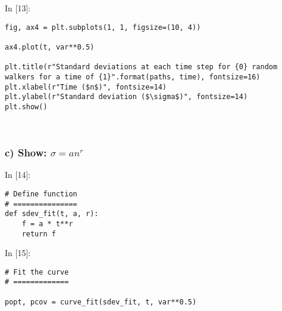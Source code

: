 \documentclass[11pt]{article}
\newif\ifcode
\newif\ifleftmargins
\newlength{\promptlength}
\newcommand{\prompt}[3]{
        \needspace{1.1cm}
        \settowidth{\promptlength}{ #1 [#3] }
        \ifleftmargins\hspace{-\promptlength}\hspace{-5pt}\fi
        {\color{#2}#1 [#3]:}
        \ifleftmargins\vspace{-2.7ex}\fi
    }
\begin{document}
    
\prompt{In}{incolor}{13}
\codetrue
\begin{tcolorbox}[breakable, size=fbox, boxrule=1pt, pad at break*=1mm, colback=cellbackground, colframe=cellborder]
\begin{verbatim}
fig, ax4 = plt.subplots(1, 1, figsize=(10, 4))

ax4.plot(t, var**0.5)

plt.title(r"Standard deviations at each time step for {0} random walkers for a time of {1}".format(paths, time), fontsize=16)    
plt.xlabel(r"Time ($n$)", fontsize=14)
plt.ylabel(r"Standard deviation ($\sigma$)", fontsize=14)
plt.show()
\end{verbatim}
\end{tcolorbox}
\codefalse

    \begin{center}
    \end{center}
    { \hspace*{\fill} \\}
    
    \hypertarget{c-show-sigma-anr}{%
\subsubsection{\texorpdfstring{c) Show:
\(\sigma = an^r\)}{c) Show: \textbackslash{}sigma = an\^{}r}}\label{c-show-sigma-anr}}

    
\prompt{In}{incolor}{14}
\codetrue
\begin{tcolorbox}[breakable, size=fbox, boxrule=1pt, pad at break*=1mm, colback=cellbackground, colframe=cellborder]
\begin{verbatim}
# Define function
# ===============
def sdev_fit(t, a, r):
    f = a * t**r
    return f
\end{verbatim}
\end{tcolorbox}
\codefalse

    
\prompt{In}{incolor}{15}
\codetrue
\begin{tcolorbox}[breakable, size=fbox, boxrule=1pt, pad at break*=1mm, colback=cellbackground, colframe=cellborder]
\begin{verbatim}
# Fit the curve
# =============

popt, pcov = curve_fit(sdev_fit, t, var**0.5)
\end{verbatim}
\end{tcolorbox}
\codefalse
\end{document}
